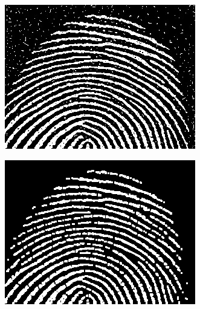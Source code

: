 \documentclass{article}
\begin{document}
\begin{figure}[htbp]
    \centering
    \begin{subfigure}{.22\textwidth}
        \includegraphics[width=\linewidth]{img/Fig0911(a)(noisy-fingerprint).jpg}
    \end{subfigure}
    \begin{subfigure}{.22\textwidth}
        \includegraphics[width=\linewidth]{img/job1-d.png}
    \end{subfigure}
    \begin{subfigure}{.22\textwidth}

\end{subfigure}
\end{figure}
\end{document}
